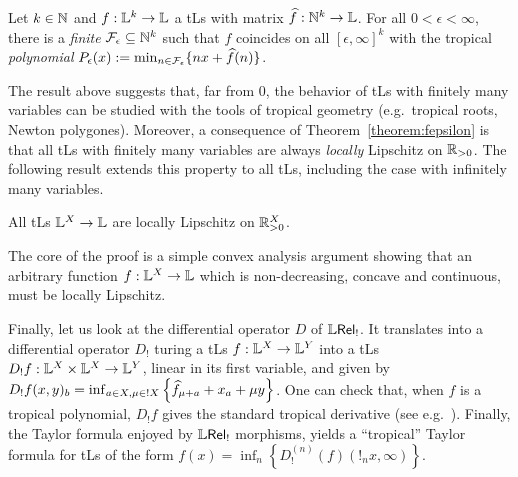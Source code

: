\documentclass[submission,%
]{eptcs}
\begin{document}
\begin{theorem}\label{theorem:fepsilon}
 Let $k\in\mathbb{N}$ and $f:\mathbb{L}^k\to\mathbb{L}$ a tLs with matrix $\widehat{f}:\mathbb{N}^k\to\mathbb{L}$.
 For all $0<\epsilon<\infty$, there is a \emph{finite} $\mathcal{F}_\epsilon \subseteq \mathbb{N}^k$ such that 
% 
$f$ coincides on all $[\epsilon,\infty]^k$ with the tropical \emph{polynomial} $P_\epsilon(x):=\min_{n\in \mathcal{F}_\epsilon}\{nx+\widehat{f}(n)\}$.
\end{theorem}
The result above suggests that, far from $0$, the behavior of tLs with finitely many variables can be studied with the tools of tropical geometry (e.g.~tropical roots, Newton polygones). %
Moreover, a consequence of Theorem~\ref{theorem:fepsilon} is that all tLs with {finitely many} variables are always \emph{locally} Lipschitz on $\mathbb{R}_{>0}$.
The following result extends this property to all tLs, including the case with infinitely many variables.





\begin{theorem}\label{thmTLSlocLip}
 All tLs $\mathbb{L}^X\to\mathbb{L}$ are locally Lipschitz on $\mathbb{R}_{>0}^X$.
\end{theorem}
The core of the proof is a simple convex analysis argument showing that an arbitrary function $f:\mathbb{L}^X\to\mathbb{L}$ which is non-decreasing, concave and continuous, must be locally Lipschitz. 

Finally, let us look at the differential operator $D$ of $\mathbb{L} \mathsf{Rel}_{!}$.
It translates into a differential operator $D_{!}$ turing a tLs $f:\mathbb{L}^{X}\to \mathbb{L}^{Y}$ into a tLs $D_{!}f:\mathbb{L}^{X}\times \mathbb{L}^{X}\to \mathbb{L}^{Y}$, linear in its first variable, and given by $D_{!}f(x,y)_{b}=\inf_{a\in X, \mu\in !X}\left\{\widehat{f}_{\mu+a}+x_{a}+\mu y\right\}$.
One can check that, when $f$ is a tropical polynomial, $D_{!}f$ gives the standard tropical derivative (see e.g.~\cite{Grigoriev2017}).
Finally, the Taylor formula enjoyed by $\mathbb{L} \mathsf{Rel}_!$ morphisms, yields a ``tropical'' Taylor formula for tLs of the form $f(x)=\inf_{n}\left\{D_{!}^{(n)}(f)(!_{n}x,\infty)\right\}$.
\end{document}
